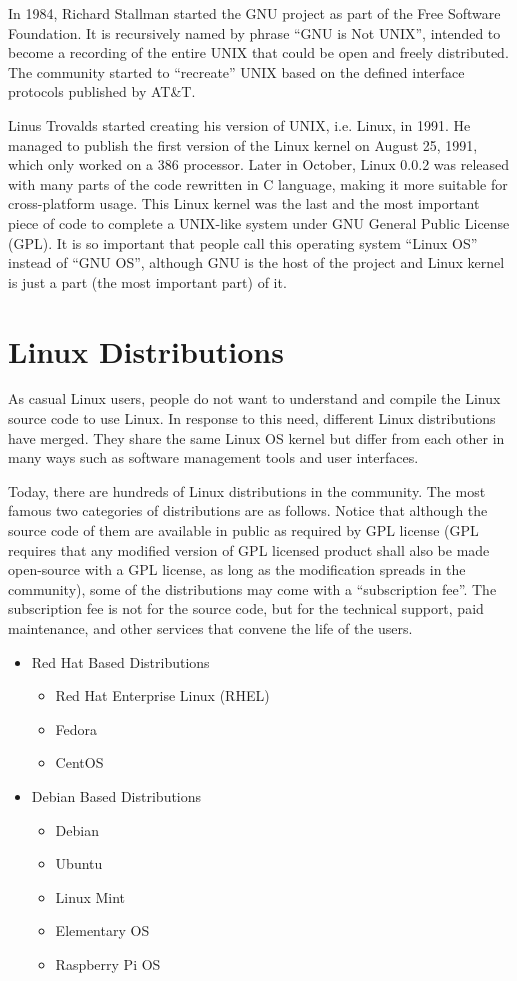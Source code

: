 In 1984, Richard Stallman started the GNU project as part of the Free Software Foundation. It is recursively named by phrase ``GNU is Not UNIX'', intended to become a recording of the entire UNIX that could be open and freely distributed. The community started to ``recreate'' UNIX based on the defined interface protocols published by AT\&T.

Linus Trovalds started creating his version of UNIX, i.e. Linux, in 1991. He managed to publish the first version of the Linux kernel on August 25, 1991, which only worked on a 386 processor. Later in October, Linux 0.0.2 was released with many parts of the code rewritten in C language, making it more suitable for cross-platform usage. This Linux kernel was the last and the most important piece of code to complete a UNIX-like system under GNU General Public License (GPL). It is so important that people call this operating system ``Linux OS'' instead of ``GNU OS'', although GNU is the host of the project and Linux kernel is just a part (the most important part) of it.

\section{Linux Distributions}

As casual Linux users, people do not want to understand and compile the Linux source code to use Linux. In response to this need, different Linux distributions have merged. They share the same Linux OS kernel but differ from each other in many ways such as software management tools and user interfaces.

Today, there are hundreds of Linux distributions in the community. The most famous two categories of distributions are as follows. Notice that although the source code of them are available in public as required by GPL license (GPL requires that any modified version of GPL licensed product shall also be made open-source with a GPL license, as long as the modification spreads in the community), some of the distributions may come with a ``subscription fee''. The subscription fee is not for the source code, but for the technical support, paid maintenance, and other services that convene the life of the users.
\begin{itemize}
  \item Red Hat Based Distributions
  \begin{itemize}
    \item Red Hat Enterprise Linux (RHEL)
    \item Fedora
    \item CentOS
  \end{itemize}
  \item Debian Based Distributions
  \begin{itemize}
    \item Debian
    \item Ubuntu
    \item Linux Mint
    \item Elementary OS
    \item Raspberry Pi OS
  \end{itemize}
\end{itemize}

